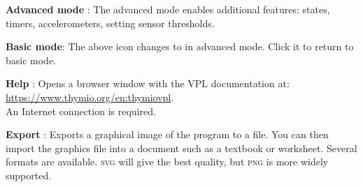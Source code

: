 \textbf{Advanced mode} : The advanced mode enables
additional features: states, timers, accelerometers, setting sensor
thresholds.

\textbf{Basic mode}: The above icon changes to  in advanced mode.
Click it to return to basic mode.

\newpage

\textbf{Help} : Opens a browser window with the VPL documentation
at:\\
\href{https://www.thymio.org/en:thymiovpl}{https://www.thymio.org/en:thymiovpl}.\\
An Internet connection is required.

\bigskip

\textbf{Export} : \label{p.export} Exports a graphical
image of the program to a file. You can then import the graphics file
into a document such as a textbook or worksheet. Several formats are
available. \textsc{svg} will give the best quality, but \textsc{png} is
more widely supported.




